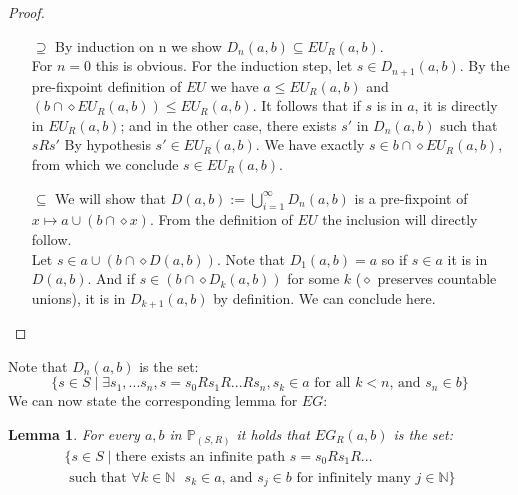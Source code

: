 \documentclass[11pt]{article}
\newtheorem{lemma}[definition]{Lemma}
\begin{document}
\begin{proof}
    \begin{itemize}
        \item[$\supseteq$] By induction on n we show $D_n(a,b) \subseteq EU_R(a,b)$.\\ For $n=0$ this is obvious. For the induction step, let $s\in D_{n+1}(a,b)$. By the pre-fixpoint definition of $EU$ we have $a\leq EU_R(a,b)$ and $(b\cap\diamond EU_R(a,b))\leq EU_R(a,b)$. It follows that if $s$ is in $a$, it is directly in $EU_R(a,b)$; and in the other case, there exists $s'$ in $D_n(a,b)$ such that $sRs'$ By hypothesis $s'\in EU_R(a,b)$. We have exactly $s\in b\cap\diamond EU_R(a,b)$, from which we conclude $s\in EU_R(a,b)$.
        \item[$\subseteq$] We will show that $D(a,b) := \bigcup_{i=1}^{\infty}D_n(a,b)$ is a pre-fixpoint of $x \mapsto a \cup (b \cap \diamond x)$. From the definition of $EU$ the inclusion will directly follow.\\ Let $s\in a \cup (b \cap \diamond D(a,b))$. Note that $D_1(a,b)=a$ so if $s\in a$ it is in $D(a,b)$. And if $s\in (b \cap \diamond D_k(a,b))$ for some $k$ ($\diamond$ preserves countable unions), it is in $D_{k+1}(a,b)$ by definition. We can conclude here.
    \end{itemize}
\end{proof}
Note that $D_n(a,b)$ is the set: \[\{s\in S\mid \exists s_1,...s_n, s=s_0Rs_1R...Rs_n, s_k\in a \mbox{ for all } k<n \mbox{, and } s_n \in b\}\]
We can now state the corresponding lemma for $EG$:
\begin{lemma}\label{EG_as_set}
    For every $a,b$ in $\mathbb{P}_{(S,R)}$ it holds that $EG_R(a,b)$ is the set:
\begin{multline*}
    \{s\in S\mid \mbox{there exists an infinite path } s=s_0Rs_1R...\\
    \mbox{ such that }\forall k\in \mathbb{N} \mbox{ } s_k\in a\mbox{, and } s_{j}\in b \mbox{ for infinitely many } j \in\mathbb{N}\}
\end{multline*}
\end{lemma}
\end{document}
